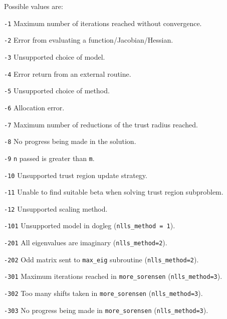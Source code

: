 
Possible values are:
\begin{description}
\item{} {\tt -1} Maximum number of iterations reached without convergence.
\item{} {\tt -2} Error from evaluating a function/Jacobian/Hessian.
\item{} {\tt -3} Unsupported choice of model.
\item{} {\tt -4} Error return from an external routine.
\item{} {\tt -5} Unsupported choice of method.
\item{} {\tt -6} Allocation error.
\item{} {\tt -7} Maximum number of reductions of the trust radius reached.
\item{} {\tt -8} No progress being made in the solution.
\item{} {\tt -9} \texttt{n} passed is greater than \texttt{m}.
\item{} {\tt -10} Unsupported trust region update strategy.
\item{} {\tt -11} Unable to find suitable beta when solving trust region subproblem.
\item{} {\tt -12} Unsupported scaling method.
\item{} {\tt -101} Unsupported model in dogleg (\texttt{nlls\_method = 1}).
\item{} {\tt -201}  All eigenvalues are imaginary (\texttt{nlls\_method=2}).
\item{} {\tt -202} Odd matrix sent to \texttt{max\_eig} subroutine (\texttt{nlls\_method=2}).
\item{} {\tt -301} Maximum iterations reached in \texttt{more\_sorensen} (\texttt{nlls\_method=3}).
\item{} {\tt -302} Too many shifts taken in \texttt{more\_sorensen} (\texttt{nlls\_method=3}).
\item{} {\tt -303} No progress being made in \texttt{more\_sorensen} (\texttt{nlls\_method=3}).
\end{description}
